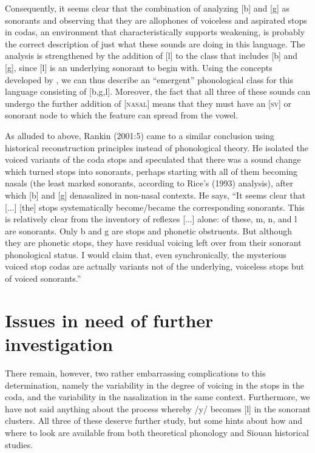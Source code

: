 \documentclass[output=paper]{LSP/langsci}
\begin{document}
Consequently, it seems clear that the combination of analyzing [b] and [g] as sonorants and observing that they are allophones of voiceless and aspirated stops in codas, an environment that characteristically supports weakening, is probably the correct description of just what these sounds are doing in this language. The analysis is strengthened by the addition of [l] to the class that includes [b] and [g], since [l] is an underlying sonorant to begin with. Using the concepts developed by \citet{Mielke2008}, we can thus describe an ``emergent'' phonological class for this language consisting of [b,g,l]. Moreover, the fact that all three of these sounds can undergo the further addition of [\textsc{nasal}] means that they must have an [\textsc{sv}] or sonorant node to which the feature can spread from the vowel.

As alluded to above, Rankin (2001:5) came to a similar conclusion using historical reconstruction principles instead of phonological theory. He isolated the voiced variants of the coda stops and speculated that there was a sound change which turned stops into sonorants, perhaps starting with all of them becoming nasals (the least marked sonorants, according to Rice's (1993) analysis), after which [b] and [g] denasalized in non-nasal contexts. He says, ``It seems clear that [...] [the] stops systematically become/became the corresponding sonorants. This is relatively clear from the inventory of reflexes [...] alone: of these, m, n,  and l are sonorants. Only b and g are stops and phonetic obstruents. But although they are phonetic stops, they have residual voicing left over from their sonorant phonological status. I would claim that, even synchronically, the mysterious voiced stop codas are actually variants not of the underlying, voiceless stops but of voiced sonorants.''

\section{Issues in need of further investigation}

There remain, however, two rather embarrassing complications to this determination, namely the variability in the degree of voicing in the stops in the coda, and the variability in the nasalization in the same context. Furthermore, we have not said anything about the process whereby /y/ becomes [l] in the sonorant clusters. All three of these deserve further study, but some hints about how and where to look are available from both theoretical phonology and Siouan historical studies.
\end{document}
